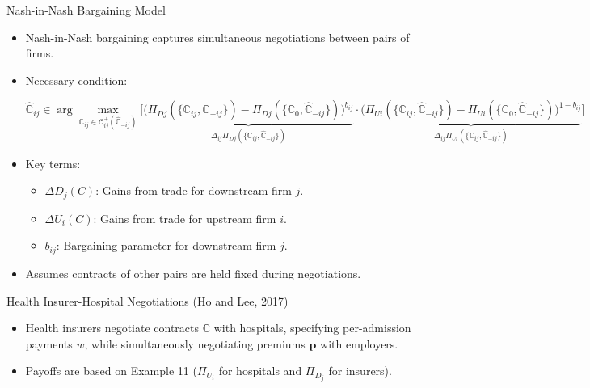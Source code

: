 \documentclass[aspectratio=169]{beamer}  %
\begin{document}
\begin{frame}{Nash-in-Nash Bargaining Model}
    \begin{itemize}
        \item Nash-in-Nash bargaining captures simultaneous negotiations between pairs of firms.
        \item Necessary condition:
\begin{footnotesize}
\[
\widehat{\mathbb{C}}_{ij} \in \arg \max_{\mathbb{C}_{ij} \in \mathcal{C}_{ij}^+(\widehat{\mathbb{C}}_{-ij})}  
\Bigg[
\underbrace{
    \Big(\Pi_{Dj}(\{\mathbb{C}_{ij}, \widehat{\mathbb{C}}_{-ij}\}) 
    - \Pi_{Dj}(\{\mathbb{C}_0, \widehat{\mathbb{C}}_{-ij}\})\Big)^{b_{ij}}
}_{\Delta_{ij} \Pi_{Dj}(\{\mathbb{C}_{ij}, \widehat{\mathbb{C}}_{-ij}\})}
\cdot
\underbrace{
    \Big(\Pi_{Ui}(\{\mathbb{C}_{ij}, \widehat{\mathbb{C}}_{-ij}\}) 
    - \Pi_{Ui}(\{\mathbb{C}_0, \widehat{\mathbb{C}}_{-ij}\})\Big)^{1-b_{ij}}
}_{\Delta_{ij} \Pi_{Ui}(\{\mathbb{C}_{ij}, \widehat{\mathbb{C}}_{-ij}\})}
\Bigg]
\]
\end{footnotesize}
        \item Key terms:
        \begin{itemize}
            \item \(\Delta D_j(C)\): Gains from trade for downstream firm \(j\).
            \item \(\Delta U_i(C)\): Gains from trade for upstream firm \(i\).
            \item \(b_{ij}\): Bargaining parameter for downstream firm \(j\).
        \end{itemize}
        \item Assumes contracts of other pairs are held fixed during negotiations.
    \end{itemize}
\end{frame}
\begin{frame}{Health Insurer-Hospital Negotiations (Ho and Lee, 2017)}
    \begin{itemize}
        \item Health insurers negotiate contracts \(\mathbb{C}\) with hospitals, specifying per-admission payments \(w\), while simultaneously negotiating premiums \(\boldsymbol{p}\) with employers.
        \item Payoffs are based on Example 11 (\(\Pi_{U_i}\) for hospitals and \(\Pi_{D_j}\) for insurers).
    \end{itemize}
\end{frame}
\end{document}
